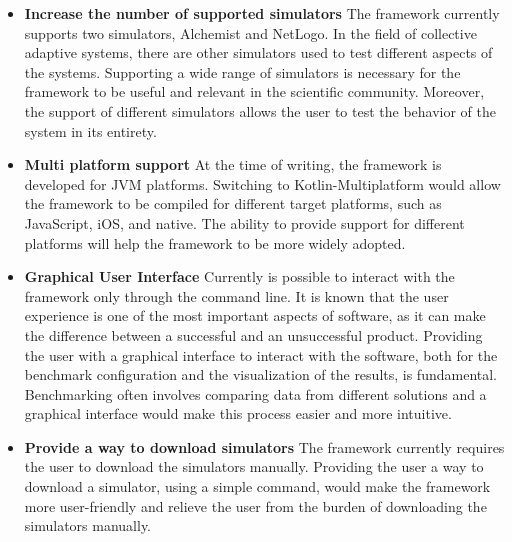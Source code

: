 \documentclass[12pt,a4paper,openright,twoside]{book}
\begin{document}
\begin{itemize}
  \item \textbf{Increase the number of supported simulators} 
  The framework currently supports two simulators, Alchemist and NetLogo.
  In the field of collective adaptive systems, there are other simulators used to test different aspects of the systems.
  Supporting a wide range of simulators is necessary for the framework to be useful and relevant in the scientific community.
  Moreover, the support of different simulators allows the user to test the behavior of the system in its entirety. 
  \item \textbf{Multi platform support}
  At the time of writing, the framework is developed for JVM platforms. 
  Switching to Kotlin-Multiplatform would allow the framework to be compiled for different target platforms, such as JavaScript, iOS, and native.
  The ability to provide support for different platforms will help the framework to be more widely adopted.
  \item \textbf{Graphical User Interface}
  Currently is possible to interact with the framework only through the command line.
  It is known that the user experience is one of the most important aspects of software, as it can make the difference between a successful and an unsuccessful product.
  Providing the user with a graphical interface to interact with the software, both for the benchmark configuration and the visualization of the results, is fundamental.
  Benchmarking often involves comparing data from different solutions and a graphical interface would make this process easier and more intuitive.
  \item \textbf{Provide a way to download simulators}
  The framework currently requires the user to download the simulators manually.
  Providing the user a way to download a simulator, using a simple command, would make the framework more user-friendly and relieve the user from the burden of downloading the simulators manually.
\end{itemize}


\backmatter




\end{document}
